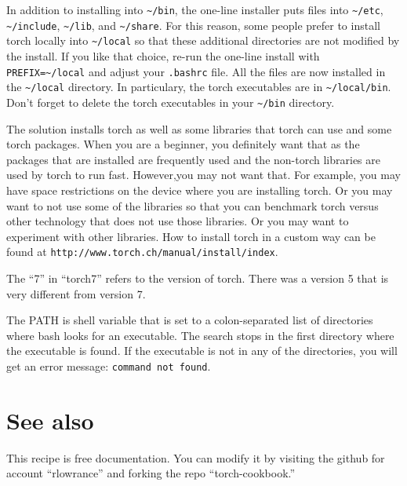 \documentclass{article}
\let\code\texttt %
\begin{document}
In addition to installing into \code{\textasciitilde/bin}, the one-line
installer puts files into \code{\textasciitilde/etc},
\code{\textasciitilde/include}, \code{\textasciitilde/lib}, and
\code{\textasciitilde/share}. For this reason, some people prefer to
install torch locally into \code{\textasciitilde/local} so that these
additional directories are not modified by the install.  If you like that
choice, re-run the one-line install with
\code{PREFIX=\textasciitilde/local} and adjust your \code{.bashrc} file.
All the files are now installed in the \code{\textasciitilde/local}
directory. In particulary, the torch executables are in
\code{\textasciitilde/local/bin}.
Don't forget to delete the torch executables in your
\code{\textasciitilde/bin} directory.

The solution installs torch as well as some libraries that torch can use
and some torch packages. When you are a beginner, you definitely want
that as the packages that are installed are frequently used and the
non-torch libraries are used by torch to run fast. However,you may not
want that. For example, you may have space restrictions on the device
where you are installing torch. Or you may want to not use some of the
libraries so that you can benchmark torch versus other technology that
does not use those libraries. Or you may want to experiment with other
libraries. How to install torch in a custom way can be found at
\code{http://www.torch.ch/manual/install/index}. 

The ``7'' in ``torch7'' refers to the version of
torch. There was a version 5 that is very different from version 7.

The PATH is shell variable that is set to a colon-separated list of
directories where bash looks for an executable. The search stops in the
first directory where the executable is found. If the executable is not
in any of the directories, you will get an error message: \code{command
not found}.  \section{See also}

This recipe is free documentation. You can modify it by visiting the
github for account ``rlowrance'' and forking the repo
``torch-cookbook.''
\end{document}
